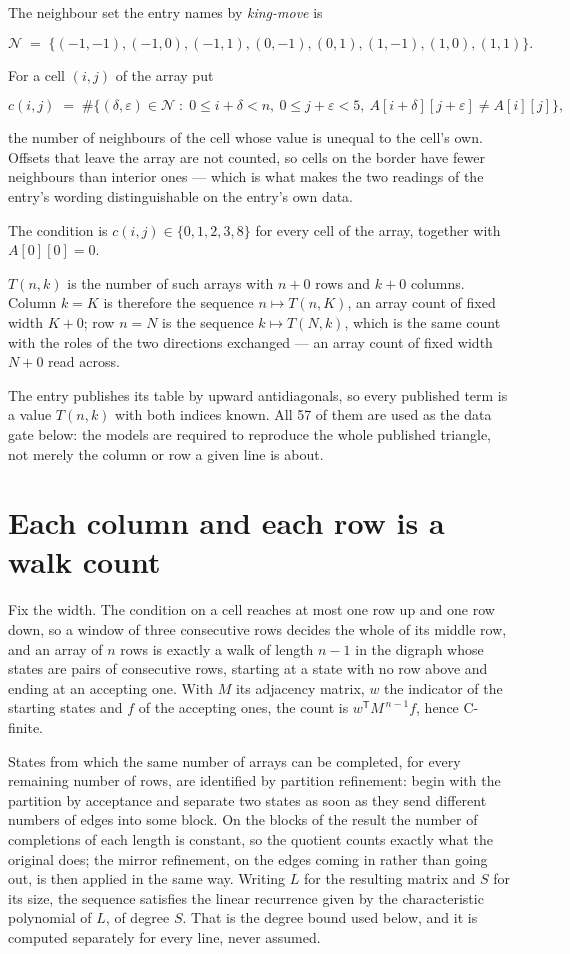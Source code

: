 \documentclass[11pt]{article}
\theoremstyle{definition}
\begin{document}
The neighbour set the entry names by {\itshape king-move} is

\[\mathcal{N} \;=\; \{(-1,-1), (-1,0), (-1,1), (0,-1), (0,1), (1,-1), (1,0), (1,1)\}.\]

For a cell $(i,j)$ of the array put

\[c(i,j) \;=\; \#\bigl\{(\delta,\varepsilon)\in\mathcal{N} \;:\; 0\le i+\delta<n,\ 0\le j+\varepsilon<5,\ A[i+\delta][j+\varepsilon] \neq A[i][j]\bigr\},\]

the number of neighbours of the cell whose value is unequal to the cell's own. Offsets that leave the array are not counted, so cells on the border have fewer neighbours than interior ones --- which is what makes the two readings of the entry's wording distinguishable on the entry's own data.

The condition is $c(i,j) \in \{0, 1, 2, 3, 8\}$ for every cell of the array, together with $A[0][0]=0$.

$T(n,k)$ is the number of such arrays with $n + 0$ rows and $k + 0$ columns. Column $k = K$ is therefore the sequence $n \mapsto T(n,K)$, an array count of fixed width $K + 0$; row $n = N$ is the sequence $k \mapsto T(N,k)$, which is the same count with the roles of the two directions exchanged --- an array count of fixed width $N + 0$ read across.

The entry publishes its table by upward antidiagonals, so every published term is a value $T(n,k)$ with both indices known. All 57 of them are used as the data gate below: the models are required to reproduce the whole published triangle, not merely the column or row a given line is about.

\section{Each column and each row is a walk count}

Fix the width. The condition on a cell reaches at most one row up and one row down, so a window of three consecutive rows decides the whole of its middle row, and an array of $n$ rows is exactly a walk of length $n-1$ in the digraph whose states are pairs of consecutive rows, starting at a state with no row above and ending at an accepting one. With $M$ its adjacency matrix, $w$ the indicator of the starting states and $f$ of the accepting ones, the count is $w^{\mathsf T}M^{\,n-1}f$, hence C-finite.

States from which the same number of arrays can be completed, for every remaining number of rows, are identified by partition refinement: begin with the partition by acceptance and separate two states as soon as they send different numbers of edges into some block. On the blocks of the result the number of completions of each length is constant, so the quotient counts exactly what the original does; the mirror refinement, on the edges coming in rather than going out, is then applied in the same way. Writing $L$ for the resulting matrix and $S$ for its size, the sequence satisfies the linear recurrence given by the characteristic polynomial of $L$, of degree $S$. That is the degree bound used below, and it is computed separately for every line, never assumed.
\end{document}
